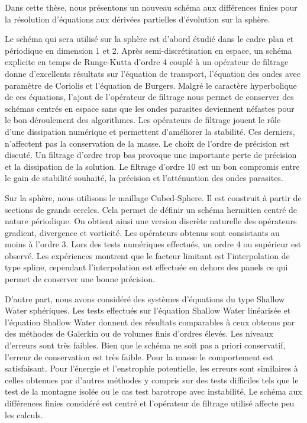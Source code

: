 
Dans cette thèse, nous présentons un nouveau schéma aux différences finies pour la résolution d'équations aux dérivées partielles d'évolution sur la sphère.

Le schéma qui sera utilisé sur la sphère est d'abord étudié dans le cadre plan et périodique en dimension 1 et 2. Après semi-discrétisation en espace, un schéma explicite en temps de Runge-Kutta d'ordre 4 couplé à un opérateur de filtrage donne d'excellents résultats sur l'équation de transport, l'équation des ondes avec paramètre de Coriolis et l'équation de Burgers. Malgré le caractère hyperbolique de ces équations, l'ajout de l'opérateur de filtrage nous permet de conserver des schémas centrés en espace sans que les ondes parasites deviennent néfastes pour le bon déroulement des algorithmes. Les opérateurs de filtrage jouent le rôle d'une dissipation numérique et permettent d'améliorer la stabilité. Ces derniers, n'affectent pas la conservation de la masse. Le choix de l'ordre de précision est discuté. Un filtrage d'ordre trop bas provoque une importante perte de précision et la dissipation de la solution. Le filtrage d'ordre 10 est un bon compromis entre le gain de stabilité souhaité, la précision et l'atténuation des ondes parasites.

Sur la sphère, nous utilisons le maillage Cubed-Sphere. Il est construit à partir de sections de grands cercles. Cela permet de définir un schéma hermitien centré de nature périodique. On obtient ainsi une version discrète naturelle des opérateurs gradient, divergence et vorticité. Les opérateurs obtenus sont consistants au moins à l'ordre 3. Lors des tests numériques effectués, un ordre 4 ou supérieur est observé. Les expériences montrent que le facteur limitant est l'interpolation de type spline, cependant l'interpolation est effectuée en dehors des panels ce qui permet de conserver une bonne précision.

D'autre part, nous avons considéré des systèmes d'équations du type Shallow Water sphériques. Les tests effectués sur l'équation Shallow Water linéarisée et l'équation Shallow Water donnent des résultats comparables à ceux obtenus par des méthodes de Galerkin ou de volumes finis d'ordres élevés. Les niveaux d'erreurs sont très faibles. Bien que le schéma ne soit pas a priori conservatif, l'erreur de conservation est très faible. Pour la masse le comportement est satisfaisant. Pour l'énergie et l'enstrophie potentielle, les erreurs sont similaires à celles obtenues par d'autres méthodes y compris sur des tests difficiles tels que le test de la montagne isolée ou le cas test barotrope avec instabilité. Le schéma aux différences finies considéré est centré et l'opérateur de filtrage utilisé affecte peu les calculs.

